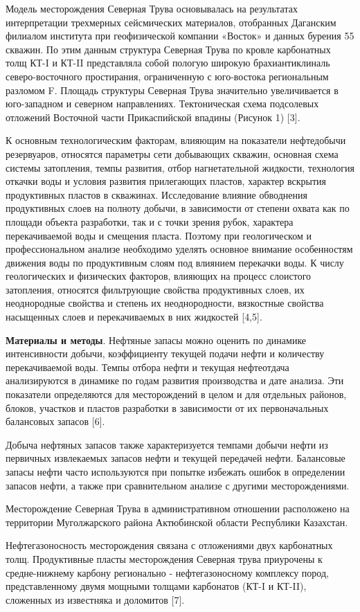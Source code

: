 \begin{multicols}{2}
Модель месторождения Северная Трува основывалась на результатах
интерпретации трехмерных сейсмических материалов, отобранных Даганским
филиалом института при геофизической компании «Восток» и данных бурения
55 скважин. По этим данным структура Северная Трува по кровле
карбонатных толщ КТ-I и КТ-II представляла собой пологую широкую
брахиантиклиналь северо-восточного простирания, ограниченную с
юго-востока региональным разломом F. Площадь структуры Северная Трува
значительно увеличивается в юго-западном и северном направлениях.
Тектоническая схема подсолевых отложений Восточной части Прикаспийской
впадины (Рисунок 1) {[}3{]}.

К основным технологическим факторам, влияющим на показатели нефтедобычи
резервуаров, относятся параметры сети добывающих скважин, основная схема
системы затопления, темпы развития, отбор нагнетательной жидкости,
технология откачки воды и условия развития прилегающих пластов, характер
вскрытия продуктивных пластов в скважинах. Исследование влияние
обводнения продуктивных слоев на полноту добычи, в зависимости от
степени охвата как по площади объекта разработки, так и с точки зрения
рубок, характера перекачиваемой воды и смещения пласта. Поэтому при
геологическом и профессиональном анализе необходимо уделять основное
внимание особенностям движения воды по продуктивным слоям под влиянием
перекачки воды. К числу геологических и физических факторов, влияющих на
процесс слоистого затопления, относятся фильтрующие свойства
продуктивных слоев, их неоднородные свойства и степень их
неоднородности, вязкостные свойства насыщенных слоев и перекачиваемых в
них жидкостей {[}4,5{]}.

{\bfseries Материалы и методы}. Нефтяные запасы можно оценить по динамике
интенсивности добычи, коэффициенту текущей подачи нефти и количеству
перекачиваемой воды. Темпы отбора нефти и текущая нефтеотдача
анализируются в динамике по годам развития производства и дате анализа.
Эти показатели определяются для месторождений в целом и для отдельных
районов, блоков, участков и пластов разработки в зависимости от их
первоначальных балансовых запасов {[}6{]}.

Добыча нефтяных запасов также характеризуется темпами добычи нефти из
первичных извлекаемых запасов нефти и текущей передачей нефти.
Балансовые запасы нефти часто используются при попытке избежать ошибок в
определении запасов нефти, а также при сравнительном анализе с другими
месторождениями.

Месторождение Северная Трува в административном отношении расположено на
территории Муголжарского района Актюбинской области Республики
Казахстан.

Нефтегазоносность месторождения связана с отложениями двух карбонатных
толщ. Продуктивные пласты месторождения Северная трува приурочены к
средне-нижнему карбону регионально - нефтегазоносному комплексу пород,
представленному двумя мощными толщами карбонатов (КТ-I и КТ-II),
сложенных из известняка и доломитов {[}7{]}.
\end{multicols}


